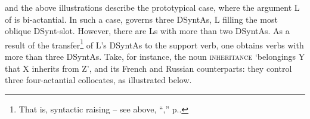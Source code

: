  and the above illustrations describe the prototypical case, where the argument L of  is  bi-actantial. In such a case,  governs three \mbox{DSyntAs}, L filling the most oblique DSynt-slot. However, there are Ls with more than two DSyntAs. As a result of the transfer\footnote{That is, syntactic raising -- see above, ``,'' p.\thinspace\pageref{par:transferOfLsActants}.} of L's DSyntAs to the support verb, one obtains  verbs with more than three DSyntAs. Take, for instance, the noun \textsc{inheritance} `belongings Y that X inherits from Z', and its French and Russian counterparts: they control three four-actantial  collocates, as illustrated below.

